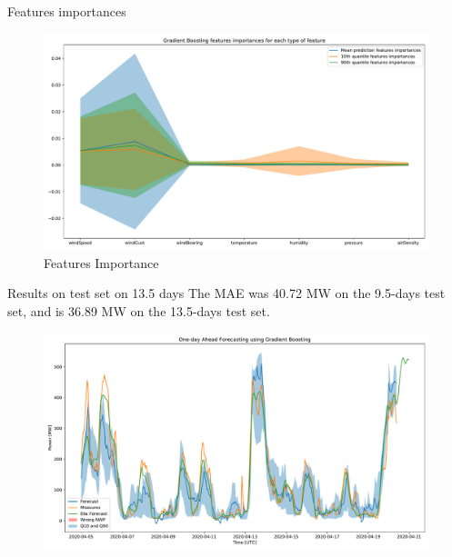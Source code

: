 \documentclass[12pt]{beamer}
\begin{document}
\begin{frame}{Features importances}
    \begin{figure}[H]
        \includegraphics[width=\textwidth]{resources/pdf/fi.pdf}
        \caption{Features Importance}
    \end{figure}
\end{frame}

\begin{frame}{Results on test set on 13.5 days}
    The MAE was 40.72 MW on the 9.5-days test set, and is 36.89 MW on the 13.5-days test set.
    \begin{figure}[H]
        \includegraphics[width=\textwidth]{resources/pdf/forecast.pdf}
    \end{figure}
\end{frame}

\begin{frame}[allowframebreaks]
    \printbibliography
\end{frame}
\end{document}

